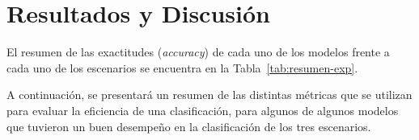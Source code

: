 \section{Resultados y Discusión}
El resumen de las exactitudes (\textit{accuracy}) de cada uno de los modelos frente a cada uno de los escenarios se encuentra en la Tabla~\ref{tab:resumen-exp}.



A continuación, se presentará un resumen de las distintas métricas que se utilizan para evaluar la eficiencia de una clasificación, para algunos de algunos modelos que tuvieron un buen desempeño en la clasificación de los tres escenarios.




